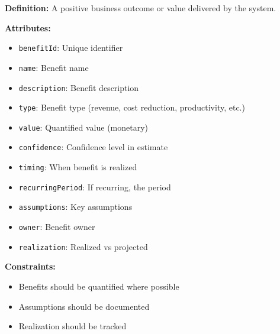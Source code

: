 \documentclass[11pt,letterpaper]{article}
\begin{document}
\begin{definitionbox}
\textbf{Definition:} A positive business outcome or value delivered by the system.

\textbf{Attributes:}
\begin{itemize}[nosep]
    \item \texttt{benefitId}: Unique identifier
    \item \texttt{name}: Benefit name
    \item \texttt{description}: Benefit description
    \item \texttt{type}: Benefit type (revenue, cost reduction, productivity, etc.)
    \item \texttt{value}: Quantified value (monetary)
    \item \texttt{confidence}: Confidence level in estimate
    \item \texttt{timing}: When benefit is realized
    \item \texttt{recurringPeriod}: If recurring, the period
    \item \texttt{assumptions}: Key assumptions
    \item \texttt{owner}: Benefit owner
    \item \texttt{realization}: Realized vs projected
\end{itemize}

\textbf{Constraints:}
\begin{itemize}[nosep]
    \item Benefits should be quantified where possible
    \item Assumptions should be documented
    \item Realization should be tracked
\end{itemize}
\end{definitionbox}
\end{document}
